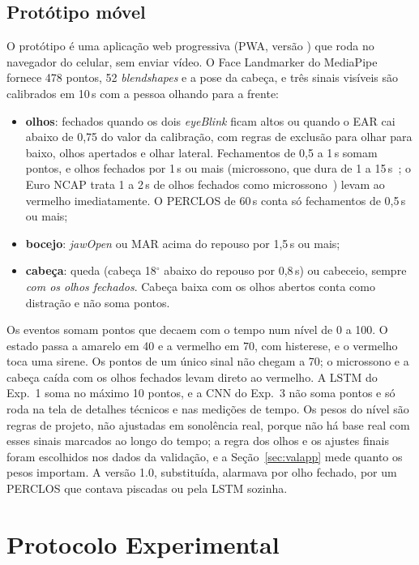 \documentclass[conference]{IEEEtran}
\begin{document}
\subsection{Protótipo móvel}
\label{sec:app}
O protótipo é uma aplicação web progressiva (PWA, versão \AppVersao) que roda no navegador do celular, sem enviar vídeo. O Face Landmarker do MediaPipe fornece 478 pontos, 52 \emph{blendshapes} e a pose da cabeça, e três sinais visíveis são calibrados em 10\,s com a pessoa olhando para a frente:
\begin{itemize}
\item \textbf{olhos}: fechados quando os dois \emph{eyeBlink} ficam altos ou quando o EAR cai abaixo de 0,75 do valor da calibração, com regras de exclusão para olhar para baixo, olhos apertados e olhar lateral. Fechamentos de 0,5 a 1\,s somam pontos, e olhos fechados por 1\,s ou mais (microssono, que dura de 1 a 15\,s~\cite{skorucak2020}; o Euro NCAP trata 1 a 2\,s de olhos fechados como microssono~\cite{euroncap2026}) levam ao vermelho imediatamente. O PERCLOS de 60\,s conta só fechamentos de 0,5\,s ou mais;
\item \textbf{bocejo}: \emph{jawOpen} ou MAR acima do repouso por 1,5\,s ou mais;
\item \textbf{cabeça}: queda (cabeça 18$^\circ$ abaixo do repouso por 0,8\,s) ou cabeceio, sempre \emph{com os olhos fechados}. Cabeça baixa com os olhos abertos conta como distração e não soma pontos.
\end{itemize}
Os eventos somam pontos que decaem com o tempo num nível de 0 a 100. O estado passa a amarelo em 40 e a vermelho em 70, com histerese, e o vermelho toca uma sirene. Os pontos de um único sinal não chegam a 70; o microssono e a cabeça caída com os olhos fechados levam direto ao vermelho. A LSTM do Exp.~1 soma no máximo 10 pontos, e a CNN do Exp.~3 não soma pontos e só roda na tela de detalhes técnicos e nas medições de tempo. Os pesos do nível são regras de projeto, não ajustadas em sonolência real, porque não há base real com esses sinais marcados ao longo do tempo; a regra dos olhos e os ajustes finais foram escolhidos nos dados da validação, e a Seção~\ref{sec:valapp} mede quanto os pesos importam. A versão 1.0, substituída, alarmava por olho fechado, por um PERCLOS que contava piscadas ou pela LSTM sozinha.

\section{Protocolo Experimental}
\label{sec:prot}
\end{document}
